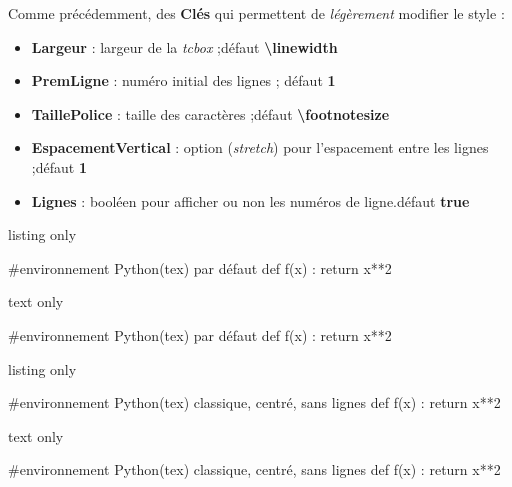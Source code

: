 \documentclass[a4paper,french,11pt]{article}
\newcommand\Cle[1]{{\bfseries\sffamily\textlangle \textcolor{orange!75!black}{#1}\textrangle}}
\begin{document}
\begin{cautionblock}
Comme précédemment, des \Cle{Clés} qui permettent de \textit{légèrement} modifier le style :

\begin{itemize}
	\item \Cle{Largeur} : largeur de la \textit{tcbox} ;\hfill{}défaut \Cle{\textbackslash linewidth}
	\item \Cle{PremLigne} : numéro initial des lignes ; \hfill{}défaut \Cle{1}
	\item \Cle{TaillePolice} : taille des caractères ;\hfill{}défaut \Cle{\textbackslash footnotesize}
	\item \Cle{EspacementVertical} : option (\textit{stretch}) pour l'espacement entre les lignes ;\hfill{}défaut \Cle{1}
	\item \Cle{Lignes} : booléen pour afficher ou non les numéros de ligne.\hfill{}défaut \Cle{true}
\end{itemize}
\vspace*{-\baselineskip}\leavevmode
\end{cautionblock}

\begin{PresCodeTexPL}{listing only}
\begin{CodePythontex}{} %
	#environnement Python(tex) par défaut
	def f(x) :
		return x**2
\end{CodePythontex}
\end{PresCodeTexPL}

\begin{PresCodeSortiePL}{text only}
\begin{CodePythontex}{}
	#environnement Python(tex) par défaut
	def f(x) :
		return x**2
\end{CodePythontex}
\end{PresCodeSortiePL}

\begin{PresCodeTexPL}{listing only}
\begin{CodePythontexAlt}[Largeur=12cm,Centre,Lignes=false]{}
	#environnement Python(tex) classique, centré, sans lignes
	def f(x) :
		return x**2
\end{CodePythontexAlt}
\end{PresCodeTexPL}

\begin{PresCodeSortiePL}{text only}
\begin{CodePythontexAlt}[Largeur=12cm,Centre,Lignes=false]{}
	#environnement Python(tex) classique, centré, sans lignes
	def f(x) :
		return x**2
\end{CodePythontexAlt}
\end{PresCodeSortiePL}
\end{document}
